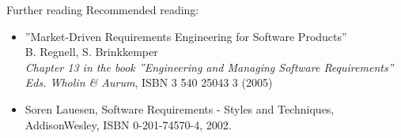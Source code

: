 \documentclass{simpleslides}
\begin{document}
\begin{frame}[fragile]{Further reading}
Recommended reading:
\begin{itemize}\footnotesize
\item ''Market-Driven Requirements Engineering for Software Products'' \\ B. Regnell, S. Brinkkemper \\ \emph{Chapter 13 in the book ''Engineering and Managing Software Requirements'' Eds. Wholin \& Aurum},  ISBN 3 540 25043 3 (2005)
\item Soren Lauesen, Software Requirements - Styles and Techniques, AddisonWesley, ISBN 0-201-74570-4, 2002.
\end{itemize}

\end{frame}
\end{document}
